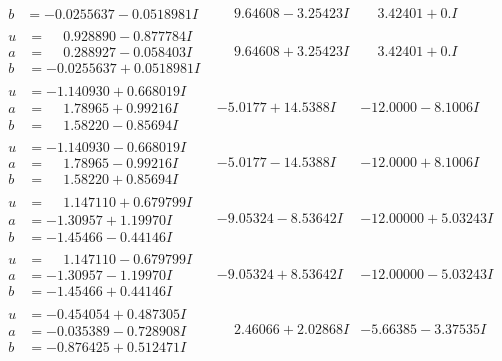 \documentclass[1p]{elsarticle_modified}
\theoremstyle{definition}
\begin{document}
$$\begin{array}{c|c|c}
\begin{aligned}
b &= -0.0255637 - 0.0518981 I\end{aligned}
 & \phantom{-}9.64608 - 3.25423 I & \phantom{-}3.42401 + 0. I\phantom{ +0.000000I} \\ \hline\begin{aligned}
u &= \phantom{-}0.928890 - 0.877784 I \\
a &= \phantom{-}0.288927 - 0.058403 I \\
b &= -0.0255637 + 0.0518981 I\end{aligned}
 & \phantom{-}9.64608 + 3.25423 I & \phantom{-}3.42401 + 0. I\phantom{ +0.000000I} \\ \hline\begin{aligned}
u &= -1.140930 + 0.668019 I \\
a &= \phantom{-}1.78965 + 0.99216 I \\
b &= \phantom{-}1.58220 - 0.85694 I\end{aligned}
 & -5.0177 + 14.5388 I & -12.0000 - 8.1006 I \\ \hline\begin{aligned}
u &= -1.140930 - 0.668019 I \\
a &= \phantom{-}1.78965 - 0.99216 I \\
b &= \phantom{-}1.58220 + 0.85694 I\end{aligned}
 & -5.0177 - 14.5388 I & -12.0000 + 8.1006 I \\ \hline\begin{aligned}
u &= \phantom{-}1.147110 + 0.679799 I \\
a &= -1.30957 + 1.19970 I \\
b &= -1.45466 - 0.44146 I\end{aligned}
 & -9.05324 - 8.53642 I & -12.00000 + 5.03243 I \\ \hline\begin{aligned}
u &= \phantom{-}1.147110 - 0.679799 I \\
a &= -1.30957 - 1.19970 I \\
b &= -1.45466 + 0.44146 I\end{aligned}
 & -9.05324 + 8.53642 I & -12.00000 - 5.03243 I \\ \hline\begin{aligned}
u &= -0.454054 + 0.487305 I \\
a &= -0.035389 - 0.728908 I \\
b &= -0.876425 + 0.512471 I\end{aligned}
 & \phantom{-}2.46066 + 2.02868 I & -5.66385 - 3.37535 I \\ \hline\begin{aligned}

\end{aligned}
\end{array}$$
\end{document}
